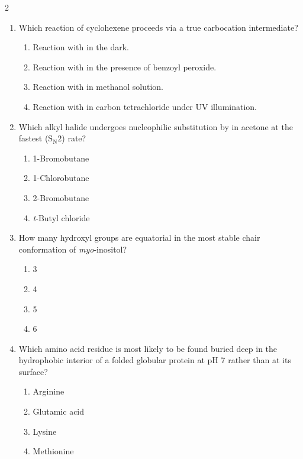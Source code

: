 \documentclass[10pt,letterpaper]{article}
\begin{document}
\begin{multicols*}{2}
\begin{enumerate}
    \item Which reaction of cyclohexene proceeds via a true carbocation intermediate?
    \begin{enumerate}[label=(\textsubscript{\Alph*})]
        \item Reaction with  in the dark.
        \item Reaction with  in the presence of benzoyl peroxide.
        \item Reaction with  in methanol solution.
        \item Reaction with  in carbon tetrachloride under UV illumination.
    \end{enumerate}

    \item Which alkyl halide undergoes nucleophilic substitution by  in acetone at the fastest ($\text{S}_{\text{N}}2$) rate?
    \begin{enumerate}[label=(\textsubscript{\Alph*})]
        \item 1-Bromobutane
        \item 1-Chlorobutane
        \item 2-Bromobutane
        \item \textit{t}-Butyl chloride
    \end{enumerate}

    \item How many hydroxyl groups are equatorial in the most stable chair conformation of \textit{myo}-inositol?
    \begin{center}
    \end{center}
    \begin{enumerate}[label=(\textsubscript{\Alph*})]
        \item 3
        \item 4
        \item 5
        \item 6
    \end{enumerate}

    \item Which amino acid residue is most likely to be found buried deep in the hydrophobic interior of a folded globular protein at pH 7 rather than at its surface?
    \begin{enumerate}[label=(\textsubscript{\Alph*})]
        \item Arginine
        \item Glutamic acid
        \item Lysine
        \item Methionine
    \end{enumerate}

\end{enumerate}

\end{multicols*}
\end{document}
